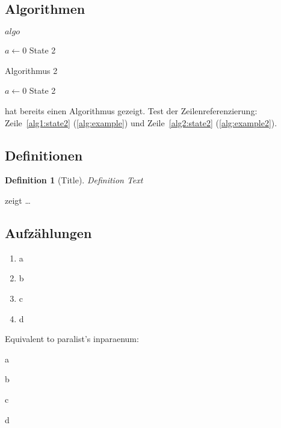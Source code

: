 \documentclass[
  fontsize=10pt
  numbers=noenddot,
  english,  %
  paper=a5,
  twoside,  %
  DIV=calc,
  headings=small,
  bibliography=totoc,
  listof=totoc,
  draft=false
]{scrbook}
\theoremstyle{break}
\newtheorem{definition}{Definition}[chapter]
\begin{document}
\subsection{Algorithmen}

\begin{algorithm}
  \caption{$algo$}
  \label{alg:example}
  \begin{algorithmic}[1]
    \State $a \gets 0$
    \State State 2\label{alg1:state2}
  \end{algorithmic}
\end{algorithm}

\begin{algorithm}
\caption{Algorithmus 2}
\label{alg:example2}
\begin{algorithmic}[1]
\State $a \gets 0$
\State State 2\label{alg2:state2}
\end{algorithmic}
\end{algorithm}

 hat bereits einen Algorithmus gezeigt.
Test der Zeilenreferenzierung: Zeile~\ref{alg1:state2} (\cref{alg:example}) und Zeile~\ref{alg2:state2} (\cref{alg:example2}).

\subsection{Definitionen}
\begin{definition}[Title]
\label{def:def1}
Definition Text
\end{definition}

 zeigt \ldots

\subsection{Aufzählungen}

\begin{enumerate}[label=\alph*)]
\item a
\item b
\item c
\item d
\end{enumerate}

Equivalent to paralist's inparaenum:
\begin{enumerate*}[label=\alph*)]
\item a
\item b
\item c
\item d
\end{enumerate*}
\end{document}
